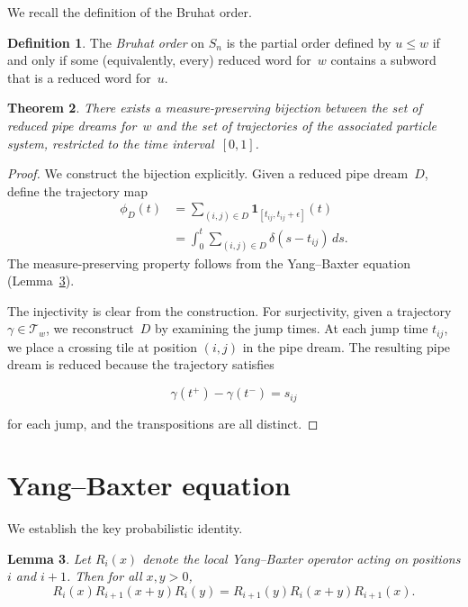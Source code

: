 \documentclass{amsart}
\theoremstyle{plain}
\newtheorem{theorem}{Theorem}[section]
\newtheorem{lemma}[theorem]{Lemma}
\theoremstyle{definition}
\newtheorem{definition}[theorem]{Definition}
\theoremstyle{remark}
\begin{document}
We recall the definition of the Bruhat order.
\begin{definition}
\label{def:bruhat}
The \emph{Bruhat order} on $S_n$ is the partial order defined by
$u \leq w$ if and only if some (equivalently, every) reduced word
for~$w$ contains a subword that is a reduced word for~$u$.
\end{definition}
\begin{theorem}
\label{thm:main-bijection}
There exists a measure-preserving bijection between the set of reduced
pipe dreams for~$w$ and the set of trajectories of the associated
particle system, restricted to the time interval~$[0,1]$.
\end{theorem}
\begin{proof}
We construct the bijection explicitly.  Given a reduced pipe dream~$D$,
define the trajectory map
\begin{align}
\label{eq:trajectory}
\phi_D(t) &= \sum_{(i,j) \in D} \mathbf{1}_{[t_{ij}, t_{ij} + \epsilon]}(t) \\
           &= \int_0^t \sum_{(i,j) \in D} \delta(s - t_{ij})\, ds.
\end{align}
The measure-preserving property follows from the Yang--Baxter equation
(Lemma~\ref{lem:yb-measure}).   

The injectivity is clear from the construction.  For surjectivity, given a
trajectory $\gamma \in \mathcal{T}_w$, we reconstruct~$D$ by examining
the jump times.  At each jump time $t_{ij}$, we place a crossing tile at
position $(i,j)$ in the pipe dream.  The resulting pipe dream is reduced
because the trajectory satisfies

\begin{equation}
\label{eq:reduced-condition}
\gamma(t^+) - \gamma(t^-) = s_{ij}
\end{equation}

for each jump, and the transpositions are all distinct.
\end{proof}



\section{Yang--Baxter equation}
\label{sec:yang-baxter}
We establish the key probabilistic identity.
\begin{lemma}
\label{lem:yb-measure}
Let $R_i(x)$ denote the local Yang--Baxter operator acting on positions
$i$ and $i+1$.  Then for all $x, y > 0$,
$$
R_i(x) R_{i+1}(x+y) R_i(y) = R_{i+1}(y) R_i(x+y) R_{i+1}(x).
$$
\end{lemma}
\end{document}
